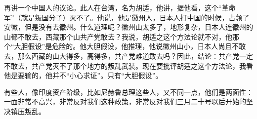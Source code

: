 再讲一个中国人的议论。此人在台湾，名为胡适，他讲，据他看，这个“革命军”（就是叛国分子）灭不了。他说，他是徽州人，日本人打中国的时候，占领了安徽，但是没有去徽州。什么道理呢？徽州山太多了，地形复杂，日本人连徽州的山都不敢去，西藏那个山共产党敢去？我说，胡适之这个方法论就不对，他那个“大胆假设”是危险的。他大胆假设，他推理，他说徽州山小，日本人尚且不敢去，那么西藏的山大得多，高得多，共产党难道敢去吗？因此，结论：共产党一定不敢去，共产党灭不了那个地方的叛乱武装。现在要批评胡适之这个方法论，我看他是要输的，他并不“小心求证”。只有“大胆假设”。

有些人，像印度资产阶级，比如尼赫鲁总理这些人，又不同一点，他们是两面性：一面非常不高兴，非常反对我们这种政策，非常反对我们三月二十号以后开始的坚决镇压叛乱。


